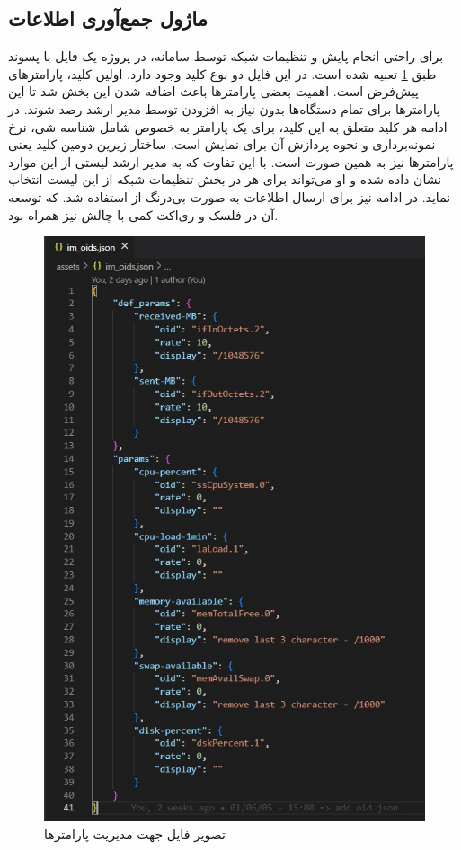 \subsection{ماژول جمع‌آوری اطلاعات }

برای راحتی انجام پایش و تنظیمات شبکه توسط سامانه، در پروژه یک فایل با پسوند  طبق \cref{fig.122} تعبیه شده است. در این فایل دو نوع کلید وجود دارد. اولین کلید، پارامترهای پیش‌فرض است. اهمیت بعضی پارامترها باعث اضافه شدن این بخش شد تا این پارامترها برای تمام دستگاه‌ها بدون نیاز به افزودن توسط مدیر ارشد رصد شوند. در ادامه هر کلید متعلق به این کلید، برای یک پارامتر به خصوص شامل شناسه شی، نرخ نمونه‌برداری و نحوه پردازش آن برای نمایش است. ساختار زیرین دومین کلید یعنی پارامترها نیز به همین صورت است. با این تفاوت که به مدیر ارشد لیستی از این موارد نشان داده شده و او می‌تواند برای هر  در بخش تنظیمات شبکه از این لیست انتخاب نماید. در ادامه نیز برای ارسال اطلاعات به صورت بی‌درنگ از  استفاده شد. که توسعه آن در فلسک و ری‌اکت کمی با چالش نیز همراه بود.


\begin{figure}[!h]
    \centering\includegraphics[scale=.80]{./im-json}
    \caption{تصویر فایل  جهت مدیریت پارامترها}\label{fig.122}
\end{figure}




